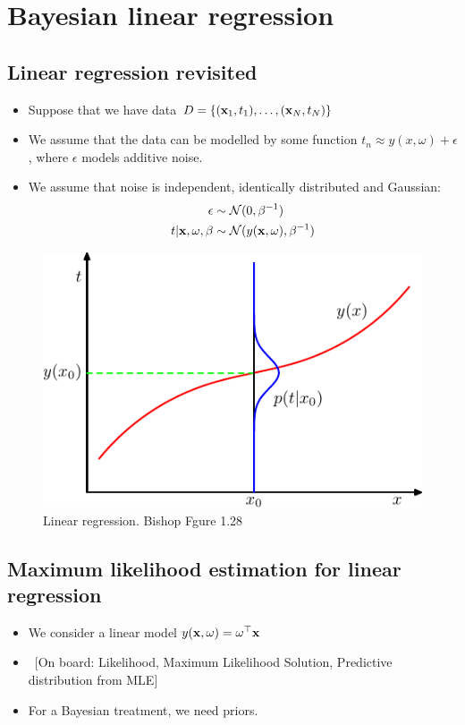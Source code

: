 \section{Bayesian linear regression}

\subsection{Linear regression revisited}
\begin{itemize}
\item Suppose that we have data $D=\{({\mathbf{x}}_1, t_1), \ldots, ({\mathbf{x}}_N, t_N) \}$
\item We assume that the data can be modelled by some function $t_n \approx y(x, \omega)+ \epsilon$, where $\epsilon$ models additive noise.
\item  We assume that noise is independent, identically distributed and Gaussian: 
\begin{align}
	\epsilon &\sim \mathcal{N}(0,\beta^{-1})\\
	t|{\mathbf{x}}, \omega, \beta &\sim \mathcal{N}(y({\mathbf{x}},\omega), \beta^{-1})
\end{align}
\end{itemize}

\begin{figure}
	\centering
	\includegraphics[width=.5\textwidth]{./lecture5/Figure128.pdf}
	\caption{Linear regression. Bishop Fgure 1.28}
\end{figure}


\subsection{Maximum likelihood estimation for linear regression}
\begin{itemize}
\item We consider a linear model $y({\mathbf{x}},\omega)= \omega^\top {\mathbf{x}}$
\item ~[On board: Likelihood, Maximum Likelihood Solution, Predictive distribution from MLE]\\
\item  For a Bayesian treatment, we need priors.
\end{itemize}

